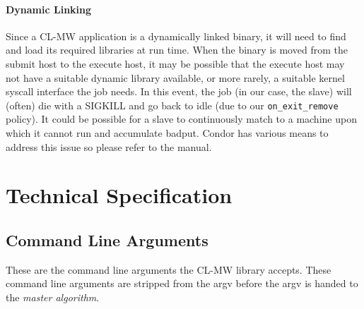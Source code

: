 \documentclass[titlepage,12pt]{book}
\newcommand{\xsmall}{\latexhtml{\small}{}}
\newcommand{\xnormalsize}{\latexhtml{\normalsize}{}}
\newcommand{\clmw}{\xsmall\textsc{CL-MW}\xnormalsize\xspace}
\newcommand{\ma}{\textit{master algorithm}\xspace}
\begin{document}
\subsubsection{Dynamic Linking}

Since a \clmw application is a dynamically linked binary, it
will need to find and load its required libraries at run time.
When the binary is moved from the submit host to the execute host,
it may be possible that the execute host may not have a suitable
dynamic library available, or more rarely, a suitable kernel syscall
interface the job needs. In this event, the job (in our case, the
slave) will (often) die with a SIGKILL and go back to idle (due to
our \texttt{on\_exit\_remove} policy). It could be possible for a
slave to continuously match to a machine upon which it cannot run and
accumulate badput. Condor has various means to address this issue
so please refer to the manual.

\chapter{Technical Specification}

\section{Command Line Arguments}
\label{command-line-arguments}

These are the command line arguments the \clmw library accepts. These
command line arguments are stripped from the argv before the argv is
handed to the \ma.
\end{document}
